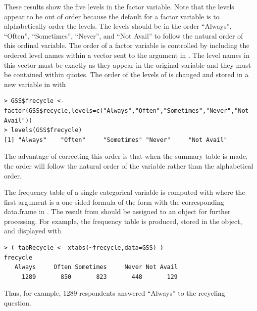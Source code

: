 \documentclass[10pt,openany]{book}\usepackage[]{graphicx}\usepackage[]{color}
\makeatletter
\newenvironment{kframe}{%
 \def\at@end@of@kframe{}%
 \ifinner\ifhmode%
  \def\at@end@of@kframe{\end{minipage}}%
  \begin{minipage}{\columnwidth}%
 \fi\fi%
 \def\FrameCommand##1{\hskip\@totalleftmargin \hskip-\fboxsep
 \colorbox{shadecolor}{##1}\hskip-\fboxsep
     \hskip-\linewidth \hskip-\@totalleftmargin \hskip\columnwidth}%
 \MakeFramed {\advance\hsize-\width
   \@totalleftmargin\z@ \linewidth\hsize
   \@setminipage}}%
 {\par\unskip\endMakeFramed%
 \at@end@of@kframe}
\newenvironment{knitrout}{}{} %
\makeatother
\begin{document}
These results show the five levels in the  factor variable.  Note that the levels appear to be out of order because the default for a factor variable is to alphabetically order the levels.  The levels should be in the order ``Always'', ``Often'', ``Sometimes'', ``Never'', and ``Not Avail'' to follow the natural order of this ordinal variable.  The order of a factor variable is controlled by including the ordered level names within a vector sent to the  argument in .  The level names in this vector must be exactly as they appear in the original variable and they must be contained within quotes.  The order of the levels of  is changed and stored in a new variable in  with
\begin{knitrout}
\color{fgcolor}\begin{kframe}
\begin{verbatim}
> GSS$frecycle <- factor(GSS$recycle,levels=c("Always","Often","Sometimes","Never","Not Avail"))
> levels(GSS$frecycle)
[1] "Always"    "Often"     "Sometimes" "Never"     "Not Avail"
\end{verbatim}
\end{kframe}
\end{knitrout}
The advantage of correcting this order is that when the summary table is made, the order will follow the natural order of the variable rather than the alphabetical order.


\vspace{-12pt}

The frequency table of a single categorical variable is computed with  where the first argument is a one-sided formula of the form  with the corresponding data.frame in .  The result from  should be assigned to an object for further processing.  For example, the frequency table is produced, stored in the  object, and displayed with
\begin{knitrout}
\color{fgcolor}\begin{kframe}
\begin{verbatim}
> ( tabRecycle <- xtabs(~frecycle,data=GSS) )
frecycle
   Always     Often Sometimes     Never Not Avail 
     1289       850       823       448       129 
\end{verbatim}
\end{kframe}
\end{knitrout}
Thus, for example, 1289 respondents answered ``Always'' to the recycling question.
\end{document}
